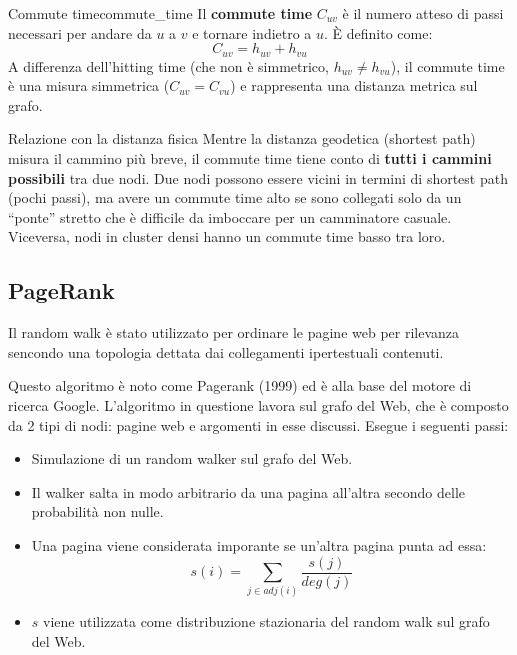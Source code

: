 \begin{definizione}{Commute time}{commute_time}
    Il \textbf{commute time} $C_{uv}$ è il numero atteso di passi necessari
    per andare da $u$ a $v$ e tornare indietro a $u$. È definito come:
    \[
    C_{uv} = h_{uv} + h_{vu}
    \]
    A differenza dell'hitting time (che non è simmetrico,
    $h_{uv} \neq h_{vu}$), il commute time è una misura simmetrica
    ($C_{uv} = C_{vu}$) e rappresenta una distanza metrica sul grafo.
\end{definizione}

\begin{nota}{Relazione con la distanza fisica}{}
    Mentre la distanza geodetica (shortest path) misura il cammino più
    breve, il commute time tiene conto di \textbf{tutti i cammini possibili}
    tra due nodi. Due nodi possono essere vicini in termini di shortest
    path (pochi passi), ma avere un commute time alto se sono collegati
    solo da un ``ponte'' stretto che è difficile da imboccare per un
    camminatore casuale.
    Viceversa, nodi in cluster densi hanno un commute time basso tra loro.
\end{nota}

\subsection{PageRank}

Il random walk è stato utilizzato per ordinare le pagine web per rilevanza
sencondo una topologia dettata dai collegamenti ipertestuali contenuti.

Questo algoritmo è noto come Pagerank (1999) ed è alla base del motore di
ricerca Google.
L'algoritmo in questione lavora sul grafo del Web, che è composto da 2 tipi di
nodi: pagine web e argomenti in esse discussi.
Esegue i seguenti passi:
\begin{itemize}
    \item Simulazione di un random walker sul grafo del Web.
    \item Il walker salta in modo arbitrario da una pagina all'altra secondo
    delle probabilità non nulle.
    \item Una pagina viene considerata imporante se un'altra pagina punta
    ad essa:
    \[
        s(i) = \sum_{j \in adj(i)} \frac{s(j)}{deg(j)}
    \]
    \item $s$ viene utilizzata come distribuzione stazionaria del random walk
    sul grafo del Web.
\end{itemize}

